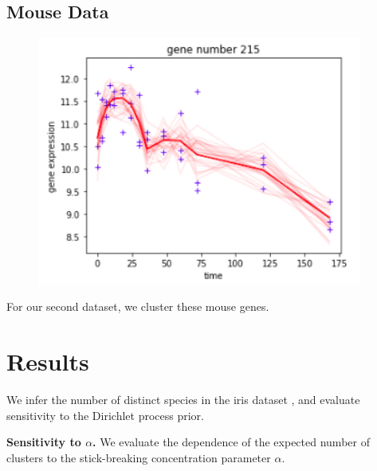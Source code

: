 \documentclass[a0,plainsections,30pt]{sciposter}\usepackage[]{graphicx}\usepackage[]{color}
\begin{document}
\begin{minipage}[t]{0.45\textwidth}
\begin{minipage}[t]{0.49\textwidth}
\subsection*{Mouse Data}
\begin{figure}[!h]
\centering
\includegraphics[width = 0.95\textwidth]{./static_images/mouse_genes.png}
\end{figure}
\end{minipage}
%
\begin{minipage}[t]{0.49\textwidth}
For our second dataset, we cluster these mouse genes.
\end{minipage}

\section*{Results}
\vspace{-0.3in}

We infer the number of distinct species in the iris
dataset \cite{iris_data_anderson}, and evaluate sensitivity to the Dirichlet process prior.
\vspace{0.1in}

{\bf \large Sensitivity to $\alpha$.}
We evaluate the dependence of the expected number of clusters to the stick-breaking concentration parameter $\alpha$.

\vspace{0.05in}
%


\end{minipage}
\end{document}
